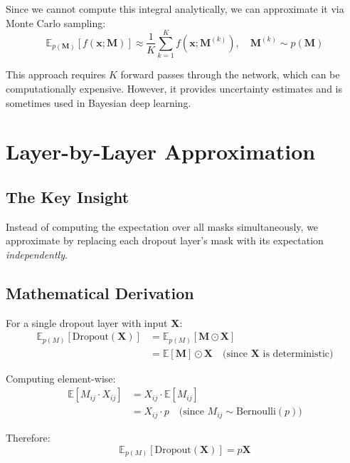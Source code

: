\begin{notechapter}
Since we cannot compute this integral analytically, we can approximate it via Monte Carlo sampling:
\begin{equation}
\mathbb{E}_{p(\mathbf{M})}[f(\mathbf{x}; \mathbf{M})] \approx \frac{1}{K} \sum_{k=1}^{K} f(\mathbf{x}; \mathbf{M}^{(k)}), \quad \mathbf{M}^{(k)} \sim p(\mathbf{M})
\end{equation}

\begin{remark}
This approach requires $K$ forward passes through the network, which can be computationally expensive. However, it provides uncertainty estimates and is sometimes used in Bayesian deep learning.
\end{remark}

\section{Layer-by-Layer Approximation}

\subsection{The Key Insight}

Instead of computing the expectation over all masks simultaneously, we approximate by replacing each dropout layer's mask with its expectation \emph{independently}.

\subsection{Mathematical Derivation}

For a single dropout layer with input $\mathbf{X}$:
\begin{align}
\mathbb{E}_{p(M)}[\text{Dropout}(\mathbf{X})] &= \mathbb{E}_{p(M)}[\mathbf{M} \odot \mathbf{X}] \\
&= \mathbb{E}[\mathbf{M}] \odot \mathbf{X} \quad \text{(since $\mathbf{X}$ is deterministic)}
\end{align}

Computing element-wise:
\begin{align}
\mathbb{E}[M_{ij} \cdot X_{ij}] &= X_{ij} \cdot \mathbb{E}[M_{ij}] \\
&= X_{ij} \cdot p \quad \text{(since $M_{ij} \sim \text{Bernoulli}(p)$)}
\end{align}

Therefore:
\begin{equation}
\boxed{\mathbb{E}_{p(M)}[\text{Dropout}(\mathbf{X})] = p\mathbf{X}}
\end{equation}


\end{notechapter}
